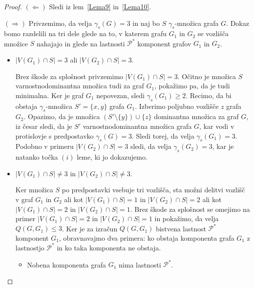 \documentclass[12pt,a4paper,twoside]{article}
\theoremstyle{definition} %
\theoremstyle{plain} %
\numberwithin{equation}{section}  %
\begin{document}
 \begin{proof}
$(\Leftarrow)$ Sledi iz lem~\ref{Lema9} in~\ref{Lema10}.

\medskip
$(\Rightarrow)$ Privzemimo, da velja $\gamma_s(G) = 3$ in naj bo $S$ $\gamma_s$-množica grafa $G$. Dokaz bomo razdelili na tri dele glede na to, v katerem grafu $G_1$ in $G_2$ se vozlišča množice $S$ nahajajo in glede na lastnosti $\mathcal{P^*}$ komponent grafov $G_1$ in $G_2$.
\begin{itemize}
\item $|V(G_1) \cap S| = 3$ ali $|V(G_2) \cap S| = 3$.

Brez škode za splošnost privzemimo $|V(G_1) \cap S| = 3$. Očitno je množica $S$ varnostnodominantna množica tudi za graf $G_1$, pokažimo pa, da je tudi minimalna. Ker je graf $G_1$ nepovezan, sledi $\gamma_s(G_1) \geq 2$. Recimo, da bi obstaja $\gamma_s$-množica $S' = \{x,y\}$ grafa $G_1$. Izberimo poljubno vozlišče $z$ grafa $G_2$. Opazimo, da je množica $(S' \setminus \{y\}) \cup \{z\}$ dominantna množica za graf $G$, iz česar sledi, da je $S'$ varnostnodominantna množica grafa $G$, kar vodi v protislovje s predpostavko $\gamma_s(G) = 3$. Sledi torej, da velja $\gamma_s(G_1) = 3$. Podobno v primeru $|V(G_2) \cap S| = 3$ sledi, da velja $\gamma_s(G_2) = 3$, kar je natanko točka $(i)$ leme, ki jo dokazujemo.

\item $|V(G_1) \cap S| \neq 3$ in $|V(G_2) \cap S| \neq 3$.

Ker množica $S$ po predpostavki vsebuje tri vozlišča, sta možni delitvi vozlišč v graf $G_1$ in $G_2$ ali kot $|V(G_1) \cap S| = 1$ in $|V(G_2) \cap S| = 2$ ali kot $|V(G_1) \cap S| = 2$ in $|V(G_2) \cap S| = 1$. Brez škode za splošnost se omejimo na primer $|V(G_1) \cap S| = 2$ in $|V(G_2) \cap S| = 1$ in pokažimo, da velja $Q(G, G_1) \leq 3$. Ker je za izračun $Q(G, G_1)$ bistvena lastnost $\mathcal{P^*}$ komponent $G_1$, obravnavajmo dva primera: ko obstaja komponenta grafa $G_1$ z lastnostjo $\mathcal{P^*}$ in ko taka komponenta ne obstaja.
\begin{itemize}
\item Nobena komponenta grafa $G_1$ nima lastnosti $\mathcal{P^*}$.


\end{itemize}
\end{itemize}
\end{proof}
\end{document}
